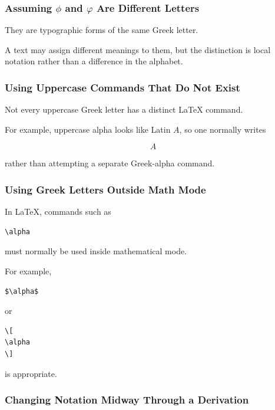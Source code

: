 \subsubsection{Assuming \(\phi\) and \(\varphi\) Are Different Letters}

They are typographic forms of the same Greek letter.

A text may assign different meanings to them, but the distinction is local
notation rather than a difference in the alphabet.

\subsubsection{Using Uppercase Commands That Do Not Exist}

Not every uppercase Greek letter has a distinct LaTeX command.

For example, uppercase alpha looks like Latin \(A\), so one normally writes

\[
\boxed{
A
}
\]

rather than attempting a separate Greek-alpha command.

\subsubsection{Using Greek Letters Outside Math Mode}

In LaTeX, commands such as

\begin{verbatim}
\alpha
\end{verbatim}

must normally be used inside mathematical mode.

For example,

\begin{verbatim}
$\alpha$
\end{verbatim}

or

\begin{verbatim}
\[
\alpha
\]
\end{verbatim}

is appropriate.

\subsubsection{Changing Notation Midway Through a Derivation}

